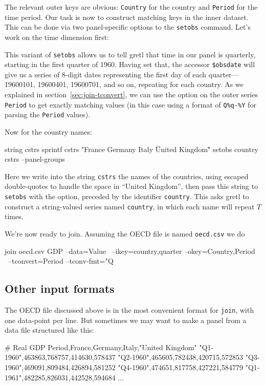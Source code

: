 The relevant outer keys are obvious: \texttt{Country} for the country
and \texttt{Period} for the time period. Our task is now to construct
matching keys in the inner dataset. This can be done via two
panel-specific options to the \texttt{setobs} command. Let's work on
the time dimension first:
This variant of \texttt{setobs} allows us to tell gretl that time in
our panel is quarterly, starting in the first quarter of 1960. Having
set that, the accessor \verb|$obsdate| will give us a series of
8-digit dates representing the first day of each quarter---19600101,
19600401, 19600701, and so on, repeating for each country. As we
explained in section~\ref{sec:join-tconvert}, we can use the
 option on the outer series \texttt{Period} to get
exactly matching values (in this case using a format of \verb|Q%q-%Y|
for parsing the \texttt{Period} values).

Now for the country names:
\begin{code}
string cstrs
sprintf cstrs "France Germany Italy \"United Kingdom\""
setobs country cstrs --panel-groups
\end{code}
Here we write into the string \texttt{cstrs} the names of the
countries, using escaped double-quotes to handle the space in ``United
Kingdom'', then pass this string to \texttt{setobs} with the
 option, preceded by the identifier
\texttt{country}. This asks gretl to construct a string-valued series
named \texttt{country}, in which each name will repeat $T$ times.

We're now ready to join. Assuming the OECD file is named
\texttt{oecd.csv} we do
\begin{code}
join oecd.csv GDP --data=Value \
 --ikey=country,quarter --okey=Country,Period \
 --tconvert=Period --tconv-fmt="Q%
\end{code}

\subsection{Other input formats}

The OECD file discussed above is in the most convenient format for
\texttt{join}, with one data-point per line. But sometimes we may want
to make a panel from a data file structured like this:
\begin{code}
# Real GDP
Period,France,Germany,Italy,"United Kingdom"
"Q1-1960",463863,768757,414630,578437
"Q2-1960",465605,782438,420715,572853
"Q3-1960",469091,809484,426894,581252
"Q4-1960",474651,817758,427221,584779
"Q1-1961",482285,826031,442528,594684
...
\end{code}

